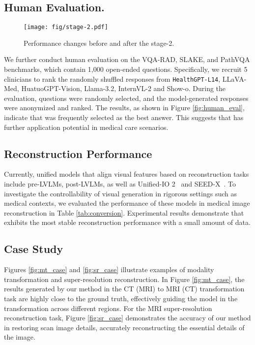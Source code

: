 \subsection{Human Evaluation.}
\begin{wrapfigure}{r}{0.4\textwidth}
    \centering
    \texttt{[image: fig/stage-2.pdf]}
    \caption{Performance changes before and after the stage-2.}
    \label{fig:stage-2}
\end{wrapfigure}
We further conduct human evaluation on the VQA-RAD, SLAKE, and PathVQA benchmarks,  which contain 1,000 open-ended questions.  Specifically, we recruit 5 clinicians to rank the randomly shuffled responses from \texttt{HealthGPT-L14}, LLaVA-Med, HuatuoGPT-Vision, Llama-3.2, InternVL-2 and Show-o. During the evaluation, questions were randomly selected, and the model-generated responses were anonymized and ranked. The results, as shown in Figure \ref{fig:human_eval}, indicate that \ourmethod{} was frequently selected as the best answer. This suggests that \ourmethod{} has further application potential in medical care scenarios.

\subsection{Reconstruction Performance}

Currently, unified models that align visual features based on reconstruction tasks include pre-LVLMs, post-LVLMs, as well as Unified-IO 2~\cite{lu2024unified} and SEED-X~\cite{ge2024seed}. To investigate the controllability of visual generation in rigorous settings such as medical contexts, we evaluated the performance of these models in medical image reconstruction in Table \ref{tab:conversion}. Experimental results demonstrate that \ourmethod{} exhibits the most stable reconstruction performance with a small amount of data.

\subsection{Case Study}
Figures \ref{fig:mt_case} and \ref{fig:sr_case} illustrate examples of modality transformation and super-resolution reconstruction. In Figure \ref{fig:mt_case}, the results generated by our method in the CT (MRI) to MRI (CT) transformation task are highly close to the ground truth, effectively guiding the model in the transformation across different regions. For the MRI super-resolution reconstruction task, Figure \ref{fig:sr_case} demonstrates the accuracy of our method in restoring scan image details, accurately reconstructing the essential details of the image.

